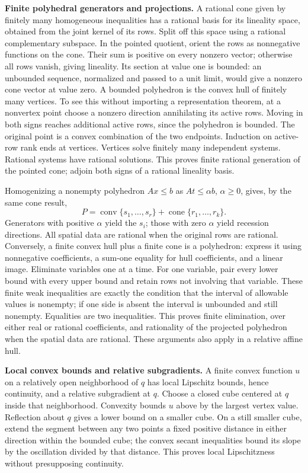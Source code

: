 \documentclass[
  11pt,
]{article}
\begin{document}
\textbf{Finite polyhedral generators and projections.} A rational cone
given by finitely many homogeneous inequalities has a rational basis for
its lineality space, obtained from the joint kernel of its rows. Split
off this space using a rational complementary subspace. In the pointed
quotient, orient the rows as nonnegative functions on the cone. Their
sum is positive on every nonzero vector; otherwise all rows vanish,
giving lineality. Its section at value one is bounded: an unbounded
sequence, normalized and passed to a unit limit, would give a nonzero
cone vector at value zero. A bounded polyhedron is the convex hull of
finitely many vertices. To see this without importing a representation
theorem, at a nonvertex point choose a nonzero direction annihilating
its active rows. Moving in both signs reaches additional active rows,
since the polyhedron is bounded. The original point is a convex
combination of the two endpoints. Induction on active-row rank ends at
vertices. Vertices solve finitely many independent systems. Rational
systems have rational solutions. This proves finite rational generation
of the pointed cone; adjoin both signs of a rational lineality basis.

Homogenizing a nonempty polyhedron \(A x\leq b\) as \(A t\leq\alpha b\),
\(\alpha\geq0\), gives, by the same cone result,
\[ P=\operatorname{conv}\{s_1,\ldots,s_r\}+\operatorname{cone}\{r_1,\ldots,r_k\}. \]
Generators with positive \(\alpha\) yield the \(s_i\); those with zero
\(\alpha\) yield recession directions. All spatial data are rational
when the original rows are rational. Conversely, a finite convex hull
plus a finite cone is a polyhedron: express it using nonnegative
coefficients, a sum-one equality for hull coefficients, and a linear
image. Eliminate variables one at a time. For one variable, pair every
lower bound with every upper bound and retain rows not involving that
variable. These finite weak inequalities are exactly the condition that
the interval of allowable values is nonempty; if one side is absent the
interval is unbounded and still nonempty. Equalities are two
inequalities. This proves finite elimination, over either real or
rational coefficients, and rationality of the projected polyhedron when
the spatial data are rational. These arguments also apply in a relative
affine hull.

\textbf{Local convex bounds and relative subgradients.} A finite convex
function \(u\) on a relatively open neighborhood of \(q\) has local
Lipschitz bounds, hence continuity, and a relative subgradient at \(q\).
Choose a closed cube centered at \(q\) inside that neighborhood.
Convexity bounds \(u\) above by the largest vertex value. Reflection
about \(q\) gives a lower bound on a smaller cube. On a still smaller
cube, extend the segment between any two points a fixed positive
distance in either direction within the bounded cube; the convex secant
inequalities bound its slope by the oscillation divided by that
distance. This proves local Lipschitzness without presupposing
continuity.
\end{document}
